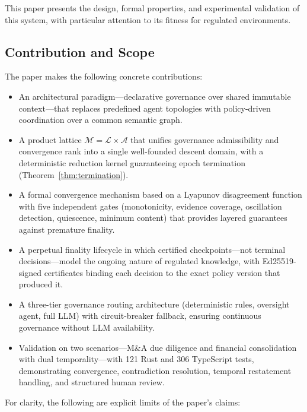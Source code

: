 \documentclass[11pt]{article}
\begin{document}
This paper presents the design, formal properties, and experimental validation of this system, with particular attention to its fitness for regulated environments.

\subsection{Contribution and Scope}

The paper makes the following concrete contributions:

\begin{itemize}
  \item An architectural paradigm---declarative governance over shared immutable context---that replaces predefined agent topologies with policy-driven coordination over a common semantic graph.
  \item A product lattice $\mathcal{M} = \mathcal{L} \times \mathcal{A}$ that unifies governance admissibility and convergence rank into a single well-founded descent domain, with a deterministic reduction kernel guaranteeing epoch termination (Theorem~\ref{thm:termination}).
  \item A formal convergence mechanism based on a Lyapunov disagreement function with five independent gates (monotonicity, evidence coverage, oscillation detection, quiescence, minimum content) that provides layered guarantees against premature finality.
  \item A perpetual finality lifecycle in which certified checkpoints---not terminal decisions---model the ongoing nature of regulated knowledge, with Ed25519-signed certificates binding each decision to the exact policy version that produced it.
  \item A three-tier governance routing architecture (deterministic rules, oversight agent, full LLM) with circuit-breaker fallback, ensuring continuous governance without LLM availability.
  \item Validation on two scenarios---M\&A due diligence and financial consolidation with dual temporality---with 121 Rust and 306 TypeScript tests, demonstrating convergence, contradiction resolution, temporal restatement handling, and structured human review.
\end{itemize}

For clarity, the following are explicit limits of the paper's claims:
\end{document}
